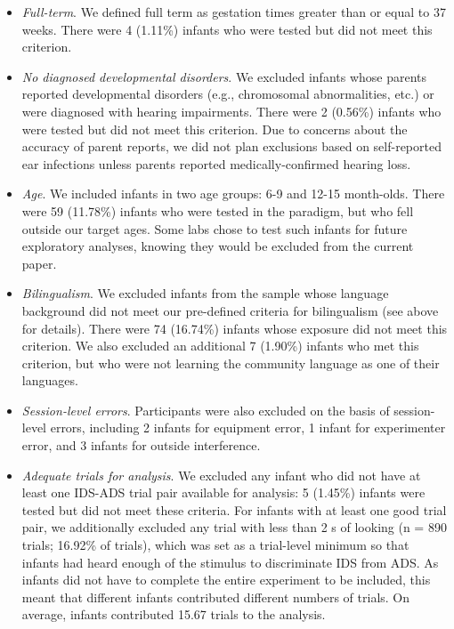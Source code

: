 \documentclass[,man,floatsintext]{apa6}
\begin{document}
\begin{itemize}
\item
  \emph{Full-term}. We defined full term as gestation times greater than or equal to 37 weeks. There were 4 (1.11\%) infants who were tested but did not meet this criterion.
\item
  \emph{No diagnosed developmental disorders}. We excluded infants whose parents reported developmental disorders (e.g., chromosomal abnormalities, etc.) or were diagnosed with hearing impairments. There were 2 (0.56\%) infants who were tested but did not meet this criterion. Due to concerns about the accuracy of parent reports, we did not plan exclusions based on self-reported ear infections unless parents reported medically-confirmed hearing loss.
\item
  \emph{Age}. We included infants in two age groups: 6-9 and 12-15 month-olds. There were 59 (11.78\%) infants who were tested in the paradigm, but who fell outside our target ages. Some labs chose to test such infants for future exploratory analyses, knowing they would be excluded from the current paper.
\item
  \emph{Bilingualism}. We excluded infants from the sample whose language background did not meet our pre-defined criteria for bilingualism (see above for details). There were 74 (16.74\%) infants whose exposure did not meet this criterion. We also excluded an additional 7 (1.90\%) infants who met this criterion, but who were not learning the community language as one of their languages.
\item
  \emph{Session-level errors}. Participants were also excluded on the basis of session-level errors, including 2 infants for equipment error, 1 infant for experimenter error, and 3 infants for outside interference.
\item
  \emph{Adequate trials for analysis}. We excluded any infant who did not have at least one IDS-ADS trial pair available for analysis: 5 (1.45\%) infants were tested but did not meet these criteria. For infants with at least one good trial pair, we additionally excluded any trial with less than 2 s of looking (n = 890 trials; 16.92\% of trials), which was set as a trial-level minimum so that infants had heard enough of the stimulus to discriminate IDS from ADS. As infants did not have to complete the entire experiment to be included, this meant that different infants contributed different numbers of trials. On average, infants contributed 15.67 trials to the analysis.
\end{itemize}
\end{document}
